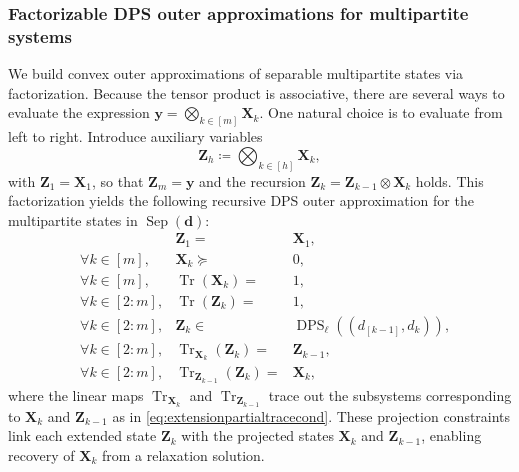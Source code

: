\documentclass[smallextended]{svjour3}
\DeclareMathOperator{\sep}{Sep}
\newcommand{\X}{\mathbf{X}}
\newcommand{\Z}{\mathbf{Z}}
\newcommand{\1}{\mathbf{1}}
\renewcommand{\X}{\mathbf{X}}
\newcommand{\y}{\mathbf{y}}
\DeclareMathOperator{\dps}{DPS}
\DeclareMathOperator{\tr}{Tr}
\DeclareMathOperator{\mtens}{\otimes}
\DeclareMathOperator{\bmtens}{\bigotimes}
\newcommand{\vc}[1]{\mathbf{#1}}
\newcommand{\vd}{\vc{d}}
\newcommand{\deq}{\coloneqq}
\begin{document}
\subsubsection{Factorizable DPS outer approximations for multipartite systems}
\label{sec.rel2}
We build convex outer approximations of separable multipartite states via factorization.
 Because the tensor product is associative, there are several ways to evaluate the expression $\y = \bmtens_{k\in[m]}\X_k$. One natural choice is to evaluate from left to right. Introduce auxiliary variables
\[
\Z_h \deq \bmtens_{k \in [h]} \X_k,
\]
with $\Z_1=\X_1$, so that $\Z_m=\y$ and the recursion $\Z_k = \Z_{k-1} \mtens \X_k$ holds. This factorization yields the following recursive DPS outer approximation for the multipartite states in $\sep(\vd)$:
\begin{subequations}
\label{eq.rmmr}
\begin{align}
&     &     \Z_{1} = & \X_1, \\
& \forall k \in[m],        &  \X_k \succeq & 0, \\
& \forall k \in[m],      &  \tr(\X_k) = & 1,\\
& \forall k \in[2:m],     &     \tr(\Z_{k}) = & 1, \\
& \forall k \in[2:m],      &     \Z_{k} \in  & \dps_{\ell}((d_{[k-1]},d_k)), \\
& \forall k \in[2:m],      &  \tr_{\X_k}(\Z_{k}) = & \Z_{k-1}, \\
& \forall k \in[2:m],      &  \tr_{\Z_{k-1}}(\Z_{k}) = & \X_k,
\end{align}
\end{subequations}
where the linear maps $\tr_{\X_k}$ and $\tr_{\Z_{k-1}}$ trace out the subsystems corresponding to $\X_k$ and $\Z_{k-1}$ as in \eqref{eq:extensionpartialtracecond}. These projection constraints link each extended state $\Z_k$ with the projected states $\X_k$ and $\Z_{k-1}$, enabling recovery of $\X_k$ from a relaxation solution.
\end{document}
